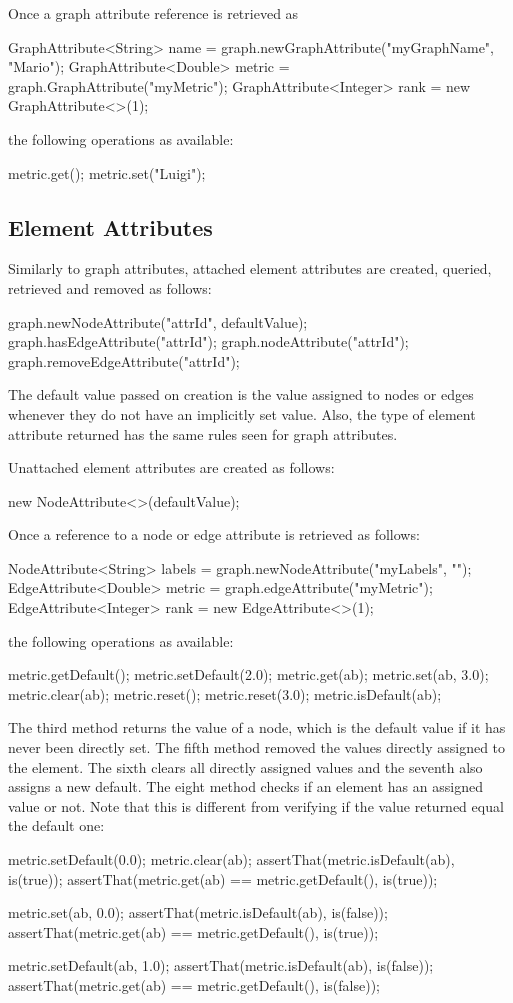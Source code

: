 Once a graph attribute reference is retrieved as
\begin{java}
GraphAttribute<String> name = graph.newGraphAttribute("myGraphName", "Mario");
GraphAttribute<Double> metric = graph.GraphAttribute("myMetric");
GraphAttribute<Integer> rank = new GraphAttribute<>(1);
\end{java}
the following operations as available:
\begin{java}
metric.get();
metric.set("Luigi");
\end{java}


\subsection{Element Attributes}
Similarly to graph attributes, attached element attributes are created, queried, retrieved and removed as follows:
\begin{java}
graph.newNodeAttribute("attrId", defaultValue);
graph.hasEdgeAttribute("attrId");
graph.nodeAttribute("attrId");
graph.removeEdgeAttribute("attrId");
\end{java}
The default value passed on creation is the value assigned to nodes or edges whenever they do not have an implicitly set value. Also, the type of element attribute returned has the same rules seen for graph attributes.

Unattached element attributes are created as follows:
\begin{java}
new NodeAttribute<>(defaultValue);
\end{java}

Once a reference to a node or edge attribute is retrieved as follows:
\begin{java}
NodeAttribute<String> labels = graph.newNodeAttribute("myLabels", "");
EdgeAttribute<Double> metric = graph.edgeAttribute("myMetric");
EdgeAttribute<Integer> rank = new EdgeAttribute<>(1);
\end{java}
the following operations as available:
\begin{java}
metric.getDefault();
metric.setDefault(2.0);
metric.get(ab);
metric.set(ab, 3.0);
metric.clear(ab);
metric.reset();
metric.reset(3.0);
metric.isDefault(ab);
\end{java}
The third method returns the value of a node, which is the default value if it has never been directly set. The fifth method removed the values directly assigned to the element. The sixth clears all directly assigned values and the seventh also assigns a new default. The eight method checks if an element has an assigned value or not. Note that this is different from verifying if the value returned equal the default one:
\begin{java}
metric.setDefault(0.0);
metric.clear(ab);
assertThat(metric.isDefault(ab), is(true));
assertThat(metric.get(ab) == metric.getDefault(), is(true));

metric.set(ab, 0.0);
assertThat(metric.isDefault(ab), is(false));
assertThat(metric.get(ab) == metric.getDefault(), is(true));

metric.setDefault(ab, 1.0);
assertThat(metric.isDefault(ab), is(false));
assertThat(metric.get(ab) == metric.getDefault(), is(false));
\end{java}


